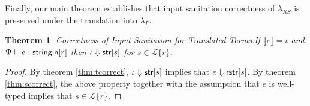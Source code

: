 \documentclass[9pt]{sig-alternate}
\newtheorem{thm}{Theorem}
\theoremstyle{definition}
\newcommand{\Lagr}{\mathcal{L}}
\newcommand{\lang}[1]{\Lagr\{#1\}}
\newcommand{\lambdas}{\lambda_{RS}}
\newcommand{\lambdap}{\lambda_P}
\newcommand{\sistr}[1]{{\sf rstr}[#1]}   \newcommand{\rstr}[1]{{\sf rstr}[#1]} %
\newcommand{\strin}[1]{\sistr{#1}}
\newcommand{\stringin}[1]{{\sf stringin}[#1]}
\renewcommand{\tstr}[1]{{{\sf str}[#1]}}
\newcommand{\str}{{\sf string}}
\newcommand{\trden}[1]{\llbracket #1 \rrbracket} %
\newcommand{\treduces}{ \Downarrow }
\newcommand{\sreduces}{ \Downarrow }
\begin{document}
Finally, our main theorem establishes that input sanitation correctness of $\lambdas$ is preserved under the translation into $\lambdap$.

\begin{thm}{Correctness of Input Sanitation for Translated Terms.}\label{thm:main}
  If $\trden{e} = \iota$ and $\sctx \vdash e : \stringin{r}$ then $\iota \sreduces \tstr{s}$
  for $s \in \lang{r}$.
\end{thm}
\begin{proof}
  By theorem \ref{thm:tcorrect}, $\iota \sreduces \tstr{s}$ implies that $e \sreduces \strin{s}$.
  By theorem \ref{thm:scorrect}, the above property together with the assumption that $e$ is well-typed implies that $s \in \lang{r}$.
\end{proof}
%
%
%
\end{document}
